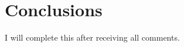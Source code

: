 \chapter{Conclusions}
\label{sec:conclusions}

I will complete this after receiving all comments.

\begin{comment}
\begin{displayquote}
Ironically, the pebble bed HTR concept has probably survived until now mainly as consequence of one of its weak points, its insufficient in-core instrumentation abilities.
\end{displayquote}
- Moormann \cite{moormann}

\begin{displayquote}
Despite many unsuccessful attempts over half a century to develop it [HTGR] as a commerical power reactor, there is still a strong belief amonst many nuclear advocates that a highly successful HTGR technology will emerge.
\end{displayquote}
- S. Thomas \cite{thomas}
\end{comment}
